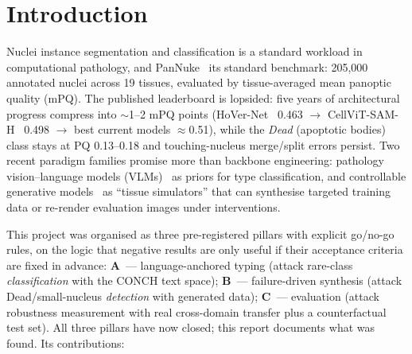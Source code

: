\documentclass[11pt]{article}
\begin{document}
\section{Introduction}
\label{sec:intro}

Nuclei instance segmentation and classification is a standard workload in computational
pathology, and PanNuke~\cite{gamper2019pannuke} its standard benchmark: 205,000 annotated nuclei
across 19 tissues, evaluated by tissue-averaged mean panoptic quality (mPQ). The published
leaderboard is lopsided: five years of architectural progress compress into
$\sim$1--2 mPQ points (HoVer-Net~\cite{graham2019hovernet} 0.463 $\rightarrow$
CellViT-SAM-H~\cite{horta2024cellvit} 0.498 $\rightarrow$ best current models
$\approx$0.51), while the \emph{Dead} (apoptotic bodies) class stays at PQ
0.13--0.18 and touching-nucleus merge/split errors persist. Two recent paradigm families
promise more than backbone engineering: pathology vision--language models
(VLMs)~\cite{lu2024conch} as priors for type classification, and controllable generative
models~\cite{le2025pixcell} as ``tissue simulators'' that can synthesise targeted training data
or re-render evaluation images under interventions.

This project was organised as three pre-registered pillars with explicit go/no-go rules, on the
logic that negative results are only useful if their acceptance criteria are fixed in advance:
\textbf{A}~--- language-anchored typing (attack rare-class \emph{classification} with the CONCH
text space); \textbf{B}~--- failure-driven synthesis (attack Dead/small-nucleus \emph{detection}
with generated data); \textbf{C}~--- evaluation (attack robustness measurement with real
cross-domain transfer plus a counterfactual test set). All three pillars have now closed; this
report documents what was found. Its contributions:
\end{document}

